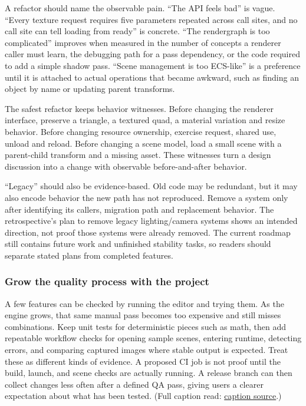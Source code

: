 A refactor should name the observable pain. ``The API feels bad'' is vague. ``Every texture request requires five parameters repeated across call sites, and no call site can tell loading from ready'' is concrete. ``The rendergraph is too complicated'' improves when measured in the number of concepts a renderer caller must learn, the debugging path for a pass dependency, or the code required to add a simple shadow pass. ``Scene management is too ECS-like'' is a preference until it is attached to actual operations that became awkward, such as finding an object by name or updating parent transforms.

The safest refactor keeps behavior witnesses. Before changing the renderer interface, preserve a triangle, a textured quad, a material variation and resize behavior. Before changing resource ownership, exercise request, shared use, unload and reload. Before changing a scene model, load a small scene with a parent-child transform and a missing asset. These witnesses turn a design discussion into a change with observable before-and-after behavior.

``Legacy'' should also be evidence-based. Old code may be redundant, but it may also encode behavior the new path has not reproduced. Remove a system only after identifying its callers, migration path and replacement behavior. The retrospective's plan to remove legacy lighting/camera systems shows an intended direction, not proof those systems were already removed. The current roadmap still contains future work and unfinished stability tasks, so readers should separate stated plans from completed features.

\subsubsection{Grow the quality process with the project}\label{06-engine-ii-ch041-grow-the-quality-process-with-the-project}

\hypertarget{06-engine-ii-ch041-grow-the-quality-process-with-the-project}{}

A few features can be checked by running the editor and trying them. As the engine grows, that same manual pass becomes too expensive and still misses combinations. Keep unit tests for deterministic pieces such as math, then add repeatable workflow checks for opening sample scenes, entering runtime, detecting errors, and comparing captured images where stable output is expected. Treat these as different kinds of evidence. A proposed CI job is not proof until the build, launch, and scene checks are actually running. A release branch can then collect changes less often after a defined QA pass, giving users a clearer expectation about what has been tested. (Full caption read: \href{https://www.youtube.com/watch?v=tHjJHmDxhug}{caption source}.)

